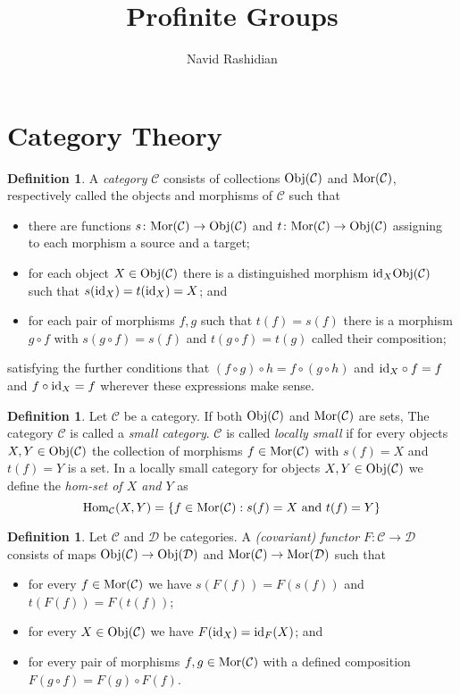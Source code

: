 \documentclass[12pt]{article}
\title{Profinite Groups}
\author{Navid Rashidian}
\date{}
\theoremstyle{definition}
\newtheorem{dfn}[thm]{Definition}
\newcommand{\CC}{\mathcal{C}}
\newcommand{\DD}{\mathcal{D}}
\newcommand{\Obj}[1]{\textup{Obj}(#1)}
\newcommand{\Mor}[1]{\textup{Mor}(#1)}
\begin{document}
\maketitle

\section{Category Theory}

\begin{dfn}
    A \emph{category} $\mathcal{C}$ consists of collections $\Obj{\CC}$ and $\Mor{\CC}$, respectively called the objects and morphisms of $\CC$ such that
    \begin{itemize}
        \item there are functions $s\colon\Mor{\CC}\to\Obj{\CC}$ and $t\colon\Mor{\CC}\to\Obj{\CC}$  assigning to each morphism a source and a target;
        \item for each object $X\in\Obj{\CC}$ there is a distinguished morphism $\textup{id}_X\Obj{\CC}$ such that $s(\textup{id}_X)=t(\textup{id}_X)=X$; and
        \item for each pair of morphisms $f,g$ such that $t(f)=s(f)$ there is a morphism $g\circ f$ with $s(g\circ f)=s(f)$ and $t(g\circ f)=t(g)$ called their composition;
    \end{itemize}
    satisfying the further conditions that $(f\circ g)\circ h=f\circ(g\circ h)$ and $\textup{id}_X\circ f=f$ and $f\circ\textup{id}_X=f$ wherever these expressions make sense.
\end{dfn}

\begin{dfn}
    Let $\CC$ be a category. If both $\Obj{\CC}$ and $\Mor{\CC}$ are sets, The category $\CC$ is called a \emph{small category}. $\CC$ is called \emph{locally small} if for every objects $X,Y\in\Obj{\CC}$ the collection of morphisms $f\in\Mor{\CC}$ with $s(f)=X$ and $t(f)=Y$ is a set. In a locally small category for objects $X,Y\in\Obj{\CC}$ we define the \emph{hom-set of $X$ and $Y$} as
    $$
        \textup{Hom}_\CC(X,Y)=\{f\in\Mor{\CC}:s(f)=X\ \textup{and}\ t(f)=Y\}
    $$
\end{dfn}

\begin{dfn}
    Let $\CC$ and $\DD$ be categories. A \emph{(covariant) functor} $F\colon\CC\to\DD$ consists of maps $\Obj{\CC}\to\Obj{\DD}$ and $\Mor{\CC}\to\Mor{\DD}$ such that
    \begin{itemize}
        \item for every $f\in\Mor{\CC}$ we have $s(F(f))=F(s(f))$ and $t(F(f))=F(t(f))$;
        \item for every $X\in\Obj{\CC}$ we have $F(\textup{id}_X)=\textup{id}_F(X)$; and
        \item for every pair of morphisms $f,g\in\Mor{\CC}$ with a defined composition $F(g\circ f)=F(g)\circ F(f)$.
    \end{itemize}
\end{dfn}
\end{document}
